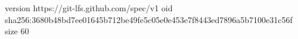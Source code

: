 version https://git-lfs.github.com/spec/v1
oid sha256:3680b48bd7ee01645b712be49fe5c05e0e453e7f8443ed7896a5b7100e31c56f
size 60
